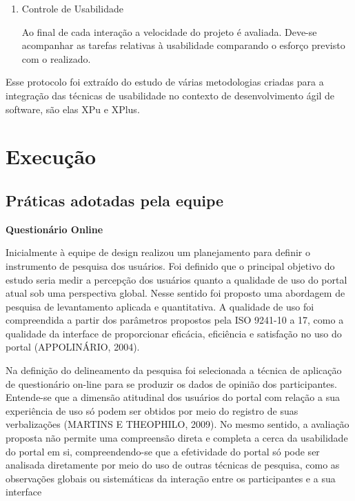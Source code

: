 \begin{enumerate}
\item Controle de Usabilidade
	
	Ao final de cada interação a velocidade do projeto é avaliada. Deve-se acompanhar as tarefas relativas à usabilidade comparando o esforço previsto com o realizado.
	
\end{enumerate}
Esse protocolo foi extraído do estudo de várias metodologias criadas para a integração das técnicas de usabilidade no contexto de desenvolvimento ágil de software, são elas XPu e XPlus.
 
 
 
\section{Execução}

\subsection{Práticas adotadas pela equipe}

\textbf{Questionário Online}

Inicialmente à equipe de design realizou um planejamento para definir o instrumento de pesquisa dos usuários. Foi definido que o principal objetivo do estudo seria medir a percepção dos usuários quanto a qualidade de uso do portal atual sob uma perspectiva global. Nesse sentido foi proposto uma abordagem de pesquisa de levantamento aplicada e quantitativa. A qualidade de uso foi compreendida a partir dos parâmetros propostos pela ISO 9241-10 a 17, como a qualidade da interface de proporcionar eficácia, eficiência e satisfação no uso do portal (APPOLINÁRIO, 2004). 

Na definição do delineamento da pesquisa foi selecionada a técnica de aplicação de questionário on-line para se produzir os dados de opinião dos participantes. Entende-se que a dimensão atitudinal dos usuários do portal com relação a sua experiência de uso só podem ser obtidos por meio do registro de suas verbalizações (MARTINS E THEOPHILO, 2009). No mesmo sentido, a avaliação proposta não permite uma compreensão direta e completa a cerca da usabilidade do portal em si, compreendendo-se que a efetividade do portal só pode ser analisada 
diretamente por meio do uso de outras técnicas de pesquisa, como as observações globais ou sistemáticas da interação entre os participantes e a sua interface %

